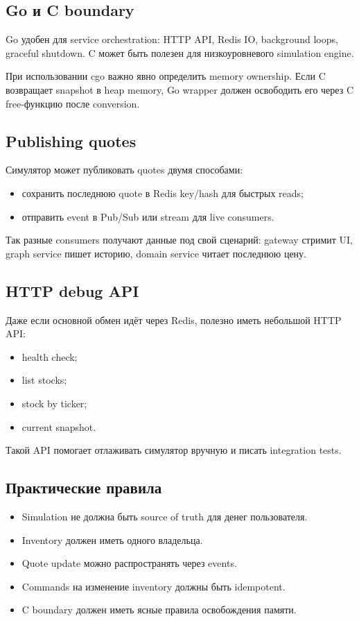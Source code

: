 \documentclass[12pt,a4paper]{article}
\begin{document}
\subsection{Go и C boundary}

Go удобен для service orchestration: HTTP API, Redis IO, background loops, graceful
shutdown. C может быть полезен для низкоуровневого simulation engine.

При использовании cgo важно явно определить memory ownership. Если C возвращает
snapshot в heap memory, Go wrapper должен освободить его через C free-функцию
после conversion.

\subsection{Publishing quotes}

Симулятор может публиковать quotes двумя способами:
\begin{itemize}
    \item сохранить последнюю quote в Redis key/hash для быстрых reads;
    \item отправить event в Pub/Sub или stream для live consumers.
\end{itemize}

Так разные consumers получают данные под свой сценарий: gateway стримит UI,
graph service пишет историю, domain service читает последнюю цену.

\subsection{HTTP debug API}

Даже если основной обмен идёт через Redis, полезно иметь небольшой HTTP API:
\begin{itemize}
    \item health check;
    \item list stocks;
    \item stock by ticker;
    \item current snapshot.
\end{itemize}

Такой API помогает отлаживать симулятор вручную и писать integration tests.

\subsection{Практические правила}

\begin{itemize}
    \item Simulation не должна быть source of truth для денег пользователя.
    \item Inventory должен иметь одного владельца.
    \item Quote update можно распространять через events.
    \item Commands на изменение inventory должны быть idempotent.
    \item C boundary должен иметь ясные правила освобождения памяти.
\end{itemize}
\end{document}
